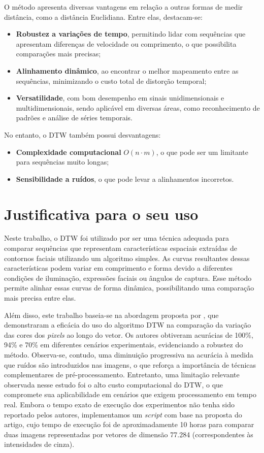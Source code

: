 O método apresenta diversas vantagens em relação a outras formas de medir distância, como a distância Euclidiana. Entre elas, destacam-se:
\begin{itemize}
    \item \textbf{Robustez a variações de tempo}, permitindo lidar com sequências que apresentam diferenças de velocidade ou comprimento, o que possibilita comparações mais precisas;
    \item \textbf{Alinhamento dinâmico}, ao encontrar o melhor mapeamento entre as sequências, minimizando o custo total de distorção temporal;
    \item \textbf{Versatilidade}, com bom desempenho em sinais unidimensionais e multidimensionais, sendo aplicável em diversas áreas, como reconhecimento de padrões e análise de séries temporais.
\end{itemize}

No entanto, o DTW também possui desvantagens:
\begin{itemize}
    \item \textbf{Complexidade computacional} \(O(n \cdot m)\), o que pode ser um limitante para sequências muito longas;
    \item \textbf{Sensibilidade a ruídos}, o que pode levar a alinhamentos incorretos.
\end{itemize}


\section{Justificativa para o seu uso}

Neste trabalho, o DTW foi utilizado por ser uma técnica adequada para comparar sequências que representam características espaciais extraídas de contornos faciais utilizando um algoritmo simples. As curvas resultantes dessas características podem variar em comprimento e forma devido a diferentes condições de iluminação, expressões faciais ou ângulos de captura. Esse método permite alinhar essas curvas de forma dinâmica, possibilitando uma comparação mais precisa entre elas.

Além disso, este trabalho baseia-se na abordagem proposta por \citet{DTW_LSTM}, que demonstraram a eficácia do uso do algoritmo DTW na comparação da variação das cores dos \textit{pixels} ao longo do vetor. Os autores obtiveram acurácias de 100\%, 94\% e 70\% em diferentes cenários experimentais, evidenciando a robustez do método. Observa-se, contudo, uma diminuição progressiva na acurácia à medida que ruídos são introduzidos nas imagens, o que reforça a importância de técnicas complementares de pré-processamento. Entretanto, uma limitação relevante observada nesse estudo foi o alto custo computacional do DTW, o que compromete sua aplicabilidade em cenários que exigem processamento em tempo real. Embora o tempo exato de execução dos experimentos não tenha sido reportado pelos autores, implementamos um \textit{script} com base na proposta do artigo, cujo tempo de execução foi de aproximadamente 10 horas para comparar duas imagens representadas por vetores de dimensão 77.284 (correspondentes às intensidades de cinza). 

